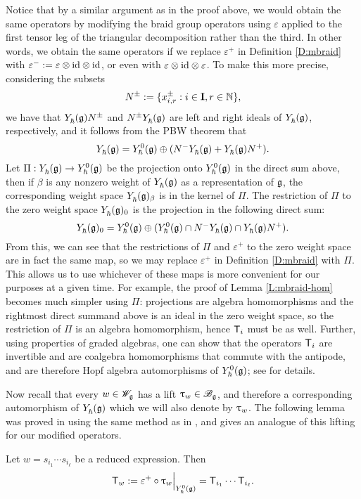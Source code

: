 Notice that by a similar argument as in the proof above, we would obtain the same operators by modifying the braid group operators using $\varepsilon$ applied to the first tensor leg of the triangular decomposition rather than the third.
In other words, we obtain the same operators if we replace $\varepsilon^+$ in Definition \ref{D:mbraid} with $\varepsilon^- := \varepsilon\otimes{\id}\otimes{\id}$, or even with $\varepsilon\otimes{\id}\otimes\varepsilon$.
To make this more precise, considering the subsets
\[N^\pm := \{x^\pm_{i,r} : i\in\I, r\in\N\},\]
we have that $\Yhg N^\pm$ and $N^\pm \Yhg$ are left and right ideals of $\Yhg$, respectively, and it follows from the PBW theorem that
\[\Yhg = \Yhg[0] \oplus (N^-\Yhg + \Yhg N^+).\]
Let $\Pi:\Yhg\to\Yhg[0]$ be the projection onto $\Yhg[0]$ in the direct sum above, then if $\beta$ is any nonzero weight of $\Yhg$ as a representation of $\g$, the corresponding weight space $\Yhg_\beta$ is in the kernel of $\Pi$.
The restriction of $\Pi$ to the zero weight space $\Yhg_0$ is the projection in the following direct sum:
\[\Yhg_0 = \Yhg[0] \oplus (\Yhg[0] \cap N^-\Yhg \cap \Yhg N^+).\]
From this, we can see that the restrictions of $\Pi$ and $\varepsilon^+$ to the zero weight space are in fact the same map, so we may replace $\varepsilon^+$ in Definition \ref{D:mbraid} with $\Pi$.
This allows us to use whichever of these maps is more convenient for our purposes at a given time.
For example, the proof of Lemma \ref{L:mbraid-hom} becomes much simpler using $\Pi$: projections are algebra homomorphisms and the rightmost direct summand above is an ideal in the zero weight space, so the restriction of $\Pi$ is an algebra homomorphism, hence $\mbraid_i$ must be as well.
Further, using properties of graded algebras, one can show that the operators $\mbraid_i$ are invertible and are coalgebra homomorphisms that commute with the antipode, and are therefore Hopf algebra automorphisms of $\Yhg[0]$; see \cite[Lemma 3.5]{friesen_braid_2024} for details.

Now recall that every $w\in\Wg$ has a lift $\braid_w\in\Bg$, and therefore a corresponding automorphism of $\Yhg$ which we will also denote by $\braid_w$.
The following lemma was proved in \cite[Lemma 3.6]{friesen_braid_2024} using the same method as in \cite[Thm. 5.3.19]{weekes_highest_2016}, and gives an analogue of this lifting for our modified operators.

\begin{lemma}\label{L:Tw}
    Let $w=s_{i_1}\cdots s_{i_\ell}$ be a reduced expression. Then
    \[\mbraid_w := \varepsilon^+\circ\braid_w\Big|_{\Yhg[0]} = \mbraid_{i_1}\cdots\mbraid_{i_\ell}.\]
\end{lemma}

